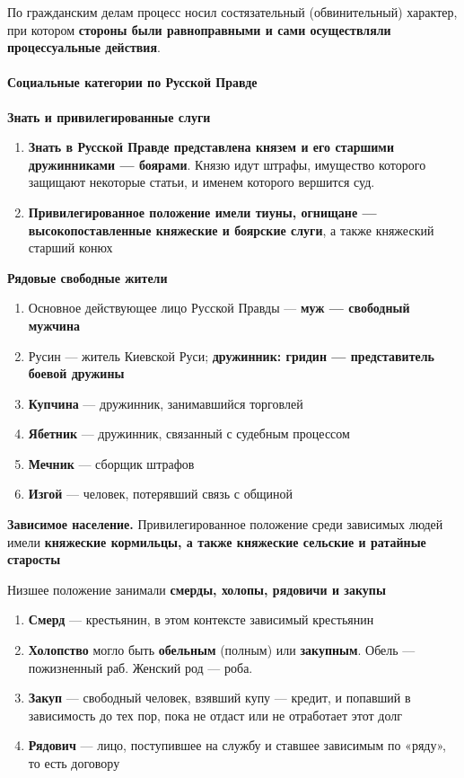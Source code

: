 \documentclass{article}
\begin{document}
По гражданским делам процесс носил состязательный (обвинительный) характер, при котором \textbf{стороны были равноправными и сами осуществляли процессуальные действия}.

\paragraph{Социальные категории по Русской Правде}

\textbf{Знать и привилегированные слуги}

\begin{enumerate}
    \item \textbf{Знать в Русской Правде представлена князем и его старшими дружинниками — боярами}. Князю идут штрафы, имущество которого защищают некоторые статьи, и именем которого вершится суд.
    \item \textbf{Привилегированное положение имели тиуны, огнищане — высокопоставленные княжеские и боярские слуги}, а также княжеский старший конюх
\end{enumerate}

\hfill

\textbf{Рядовые свободные жители}

\begin{enumerate}
    \item Основное действующее лицо Русской Правды — \textbf{муж — свободный мужчина}
    \item Русин — житель Киевской Руси; \textbf{дружинник: гридин — представитель боевой дружины}
    \item \textbf{Купчина} — дружинник, занимавшийся торговлей
    \item \textbf{Ябетник} — дружинник, связанный с судебным процессом
    \item \textbf{Мечник} — сборщик штрафов
    \item \textbf{Изгой} — человек, потерявший связь с общиной
\end{enumerate}

\hfill

\textbf{Зависимое население.} Привилегированное положение среди зависимых людей имели \textbf{княжеские кормильцы, а также княжеские сельские и ратайные старосты}

Низшее положение занимали \textbf{смерды, холопы, рядовичи и закупы}

\begin{enumerate}
    \item \textbf{Смерд} — крестьянин, в этом контексте зависимый крестьянин
    \item \textbf{Холопство} могло быть \textbf{обельным} (полным) или \textbf{закупным}. Обель — пожизненный раб. Женский род — роба.
    \item \textbf{Закуп} — свободный человек, взявший купу — кредит, и попавший в зависимость до тех пор, пока не отдаст или не отработает этот долг
    \item \textbf{Рядович} — лицо, поступившее на службу и ставшее зависимым по «ряду», то есть договору
\end{enumerate}
\end{document}
